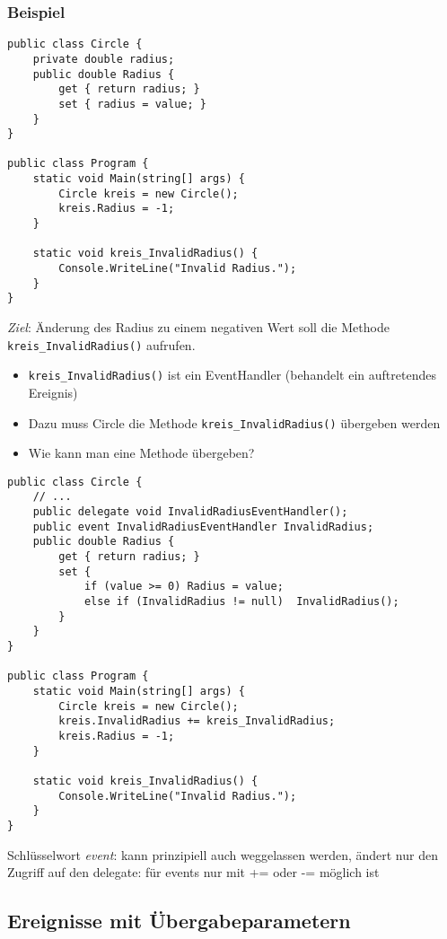\subsubsection*{Beispiel}
\begin{lstlisting}[language={[Sharp]C}]
public class Circle {
	private double radius;
	public double Radius {
		get { return radius; }
		set { radius = value; }
	}
}

public class Program {  
	static void Main(string[] args) {
		Circle kreis = new Circle();
		kreis.Radius = -1;
	}
	
	static void kreis_InvalidRadius() {
		Console.WriteLine("Invalid Radius.");  
	}
}
\end{lstlisting}

\emph{Ziel}: Änderung des Radius zu einem negativen Wert soll die Methode \lstinline$kreis_InvalidRadius()$ aufrufen.

\begin{itemize}
\item \lstinline$kreis_InvalidRadius()$ ist ein EventHandler (behandelt ein auftretendes Ereignis)
\item Dazu muss Circle die Methode \lstinline$kreis_InvalidRadius()$ übergeben werden
\item Wie kann man eine Methode übergeben? 
\end{itemize}

\begin{lstlisting}[language={[Sharp]C}]
public class Circle {
	// ...
	public delegate void InvalidRadiusEventHandler();
	public event InvalidRadiusEventHandler InvalidRadius;
	public double Radius {
		get { return radius; }
		set {
			if (value >= 0) Radius = value;
			else if (InvalidRadius != null)  InvalidRadius();
		}
	}
}

public class Program {  
	static void Main(string[] args) {
		Circle kreis = new Circle();
		kreis.InvalidRadius += kreis_InvalidRadius;
		kreis.Radius = -1;
	}

	static void kreis_InvalidRadius() {
		Console.WriteLine("Invalid Radius.");  
	}
}
\end{lstlisting}

Schlüsselwort \emph{event}: kann prinzipiell auch weggelassen werden, ändert nur den Zugriff auf den delegate: für events nur mit += oder -=  möglich ist

\subsection{Ereignisse mit Übergabeparametern}

